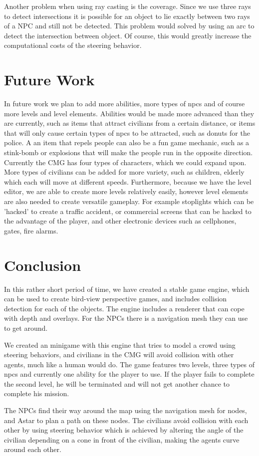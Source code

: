 \documentclass[a4paper,pdf,12pt]{article}
\begin{document}
Another problem when using ray casting is the coverage. Since we use three rays to detect intersections it is possible for an object to lie exactly between two rays of a NPC and still not be detected. This problem would solved by using an arc to detect the intersection between object. Of course, this would greatly increase the computational costs of the steering behavior.

\section{Future Work}
\label{sec:Future Work}
In future work we plan to add more abilities, more types of npcs and of course more levels and level elements. Abilities would be made more advanced than they are currently, such as items that attract civilians from a certain distance, or items that will only cause certain types of npcs to be attracted, such as donuts for the police. A an item that repels people can also be a fun game mechanic, such as a stink-bomb or explosions that will make the people run in the opposite direction. Currently the CMG has four types of characters, which we could expand upon. More types of civilians can be added for more variety, such as children, elderly which each will move at different speeds. Furthermore, because we have the level editor, we are able to create more levels relatively easily, however level elements are also needed to create versatile gameplay. For example stoplights which can be 'hacked' to create a traffic accident, or commercial screens that can be hacked to the advantage of the player, and other electronic devices such as cellphones, gates, fire alarms.

\section{Conclusion}
\label{sec:Conclusion}

In this rather short period of time, we have created a stable game engine, which can be used to create bird-view perspective games, and includes collision detection for each of the objects. The engine includes a renderer that can cope with depth and overlays. For the NPCs there is a navigation mesh they can use to get around. 

We created an minigame with this engine that tries to model a crowd using steering behaviors, and civilians in the CMG will avoid collision with other agents, much like a human would do. The game features two levels, three types of npcs and currently one ability for the player to use. If the player fails to complete the second level, he will be terminated and will not get another chance to complete his mission.

The NPCs find their way around the map using the navigation mesh for nodes, and Astar to plan a path on these nodes. The civilians avoid collision with each other by using steering behavior which is achieved by altering the angle of the civilian depending on a cone in front of the civilian, making the agents curve around each other.




\end{document}
